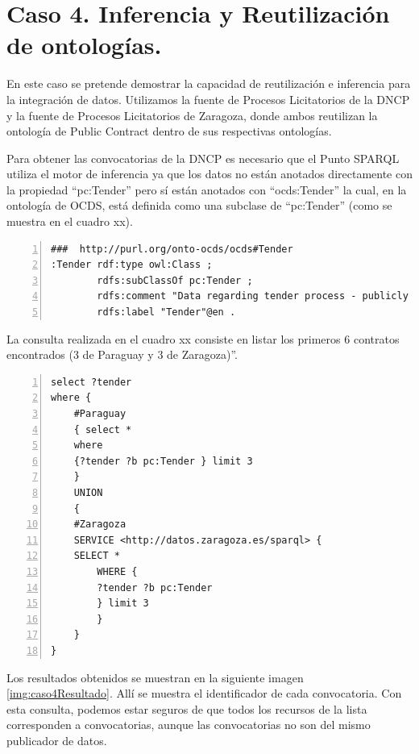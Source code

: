\section{Caso 4. Inferencia y Reutilización de ontologías. }

En este caso se pretende demostrar la capacidad de reutilización e inferencia para la integración de datos. Utilizamos la fuente de Procesos Licitatorios de la DNCP y la fuente de Procesos Licitatorios de Zaragoza, donde ambos reutilizan la ontología de Public Contract dentro de sus respectivas ontologías.

Para obtener las convocatorias de la DNCP es necesario que el Punto SPARQL utiliza el motor de inferencia ya que los datos no están anotados directamente con la propiedad “pc:Tender” pero sí están anotados con “ocds:Tender” la cual, en la ontología de OCDS, está definida como una subclase de “pc:Tender” (como se muestra en el cuadro xx).

\begin{lstlisting}[captionpos=b, caption=Información referente al proceso licitatorio cuyo identificacor es, label=lst:caso1,  numbers=left,  numberstyle=\tiny\color{mygray},
    basicstyle=\ttfamily,frame=single]
###  http://purl.org/onto-ocds/ocds#Tender
:Tender rdf:type owl:Class ;
        rdfs:subClassOf pc:Tender ;
        rdfs:comment "Data regarding tender process - publicly inviting prospective contractors to submit bids for evaluation and selecting a winner or winners"@en ;
        rdfs:label "Tender"@en .
 \end{lstlisting}

 La consulta realizada en el cuadro xx consiste en listar los primeros 6 contratos encontrados (3 de Paraguay y 3 de Zaragoza)”.

 \begin{lstlisting}[captionpos=b, caption=Información referente al proceso licitatorio cuyo identificacor es, label=lst:caso1,  numbers=left,  numberstyle=\tiny\color{mygray},
    basicstyle=\ttfamily,frame=single]
select ?tender
where {
    #Paraguay
    { select * 
    where 
    {?tender ?b pc:Tender } limit 3 
    }
    UNION 
    { 
    #Zaragoza
    SERVICE <http://datos.zaragoza.es/sparql> {
    SELECT * 
        WHERE {
        ?tender ?b pc:Tender 
        } limit 3
        }
    }
}
 \end{lstlisting}

 Los resultados obtenidos se muestran en la siguiente imagen \ref{img:caso4Resultado}. Allí se muestra el identificador de cada convocatoria. Con esta consulta, podemos estar seguros de que todos los recursos de la lista corresponden a convocatorias, aunque las convocatorias no son del mismo publicador de datos.



